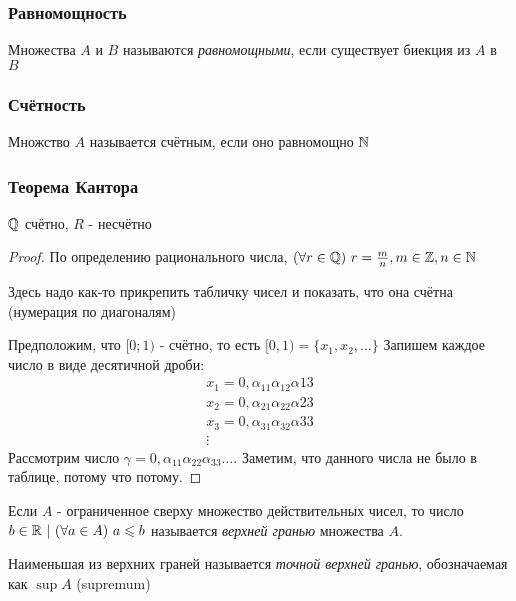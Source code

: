 \subsubsection{Равномощность}

\begin{definition}
    Множества $A$ и $B$ называются \textit{равномощными}, если существует биекция из $A$ в $B$
\end{definition}

\subsubsection{Счётность}

\begin{definition}
    Множство $A$ называется счётным, если оно равномощно $\mathbb{N}$
\end{definition}

\subsubsection{Теорема Кантора}

\begin{proposition}
    $\mathbb{Q}$ счётно, $R$ - несчётно
\end{proposition}

\begin{proof}
    По определению рационального числа, $(\forall r \in \mathbb{Q})\ r = \frac{m}{n}, m \in \mathbb{Z}, n \in \mathbb{N}$
    
    Здесь надо как-то прикрепить табличку чисел и показать, что она счётна (нумерация по диагоналям)
    
    Предположим, что $[0; 1)$ - счётно, то есть $[0, 1) = \{x_1, x_2, \dots\}$
    Запишем каждое число в виде десятичной дроби:
    \begin{align*}
        x_1 = 0, \alpha_{11} \alpha_{12} \alpha{13} \\
        x_2 = 0, \alpha_{21} \alpha_{22} \alpha{23} \\
        x_3 = 0, \alpha_{31} \alpha_{32} \alpha{33} \\
        \vdots
    \end{align*}
    Рассмотрим число $\gamma = 0, \alpha_{11} \alpha_{22} \alpha_{33} \dots$. Заметим, что данного числа не было в таблице, потому что потому.
\end{proof}

\begin{definition}
    Если $A$ - ограниченное сверху множество действительных чисел, то число $b \in \mathbb{R}\ |\ (\forall a \in A)\ a \leqslant b$ называется \textit{верхней гранью} множества $A$.
    
    Наименьшая из верхних граней называется \textit{точной верхней гранью}, обозначаемая как $\sup A$ (supremum)
\end{definition}

